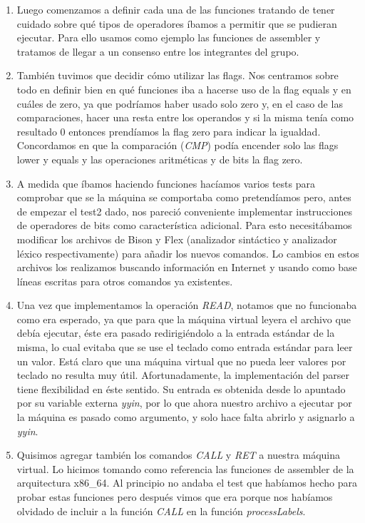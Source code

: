 \documentclass[a4paper,12pt]{article}
\begin{document}
\begin{enumerate}
Adem\'as, en el caso de que el operando sea un label, en el miembro lab de la estructura se guarda una cadena con su nombre. 
\item
Luego comenzamos a definir cada una de las funciones tratando de tener cuidado sobre qu\'e tipos de operadores \'ibamos a permitir que se pudieran ejecutar. Para ello usamos como ejemplo las funciones de assembler y tratamos de llegar a un consenso entre los integrantes del grupo.
\item
Tambi\'en tuvimos que decidir c\'omo utilizar las flags. Nos centramos sobre todo en definir bien en qu\'e funciones iba a hacerse uso de la flag equals y en cu\'ales de zero, ya que podr\'iamos haber usado solo zero y, en el caso de las comparaciones, hacer una resta entre los operandos y si la misma ten\'ia como resultado 0 entonces prend\'iamos la flag zero para indicar la igualdad. Concordamos en que la comparaci\'on (\emph{CMP}) pod\'ia encender solo las flags lower y equals y las operaciones aritm\'eticas y de bits la flag zero.
\item 
A medida que \'ibamos haciendo funciones hac\'iamos varios tests para comprobar que se la m\'aquina se comportaba como pretend\'iamos pero, antes de empezar el test2 dado, nos pareci\'o conveniente implementar instrucciones de operadores de bits como caracter\'istica adicional. Para esto necesit\'abamos modificar los archivos de Bison y Flex (analizador sint\'actico y analizador l\'exico respectivamente) para añadir los nuevos comandos. Lo cambios en estos archivos los realizamos buscando informaci\'on en Internet y usando como base l\'ineas escritas para otros comandos ya existentes.
\item
Una vez que implementamos la operaci\'on \emph{READ}, notamos que no funcionaba como era esperado, ya que para que la m\'aquina virtual leyera el archivo que deb\'ia ejecutar, \'este era pasado redirigi\'endolo a la entrada est\'andar de la misma, lo cual evitaba que se use el teclado como entrada est\'andar para leer un valor.
Est\'a claro que una m\'aquina virtual que no pueda leer valores por teclado no resulta muy \'util. Afortunadamente, la implementaci\'on del parser tiene flexibilidad en \'este sentido. Su entrada es obtenida desde lo apuntado por su variable externa \emph{yyin}, por lo que ahora nuestro archivo a ejecutar por la m\'aquina es pasado como argumento, y solo hace falta abrirlo y asignarlo a \emph{yyin}.
\item
Quisimos agregar tambi\'en los comandos \emph{CALL} y \emph{RET} a nuestra m\'aquina virtual. Lo hicimos tomando como referencia las funciones de assembler de la arquitectura x86\_64. Al principio no andaba el test que hab\'iamos hecho para probar estas funciones pero despu\'es vimos que era porque nos hab\'iamos olvidado de incluir a la funci\'on \emph{CALL} en la funci\'on \emph{processLabels}. 
\end{enumerate}
\end{document}
